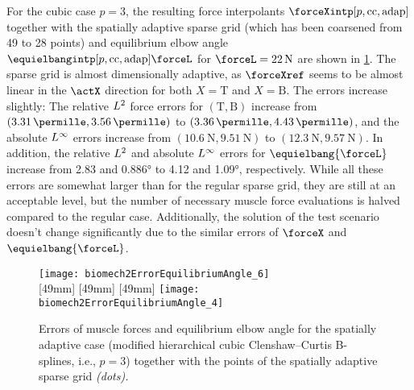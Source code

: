 For the cubic case $p = 3$,
the resulting force interpolants $\forceXintp[p,\cc,\mathrm{adap}]$ together
with the spatially adaptive sparse grid
(which has been coarsened from 49 to 28 points) and
equilibrium elbow angle $\equielbangintp[p,\cc,\mathrm{adap}]{\forceL}$
for $\forceL = \SI{22}{\newton}$ are shown in
\cref{fig:biomech2SpatiallyAdaptive}.
The sparse grid is almost dimensionally adaptive,
as $\forceXref$ seems to be almost linear in the $\actX$ direction
for both $X = \mathrm{T}$ and $X = \mathrm{B}$.
The errors increase slightly:
The relative $L^2$ force errors for $(\mathrm{T}, \mathrm{B})$ increase
from $(\SI{3.31}{\permille}, \SI{3.56}{\permille})$
to $(\SI{3.36}{\permille}, \SI{4.43}{\permille})$,
and the absolute $L^\infty$ errors increase
from $(\SI{10.6}{\newton}, \SI{9.51}{\newton})$
to $(\SI{12.3}{\newton}, \SI{9.57}{\newton})$.
In addition, the relative $L^2$ and absolute $L^\infty$ errors
for $\equielbang{\forceL}$ increase
from \SI{2.83}{\permille} and \ang{0.886}
to \SI{4.12}{\permille} and \ang{1.09}, respectively.
While all these errors are somewhat larger than for the regular sparse grid,
they are still at an acceptable level,
but the number of necessary muscle force evaluations is halved compared
to the regular case.
Additionally, the solution of the test scenario doesn't change significantly
due to the similar errors of $\forceX$ and $\equielbang{\forceL}$.

\begin{figure}
  \hspace*{2mm}%
  \hspace*{12mm}%
  \texttt{[image: biomech2ErrorEquilibriumAngle\_6]}%
  \\[2mm]%
  [49mm]{%
  }%
  \hfill%
  [49mm]{%
  }%
  \hfill%
  [49mm]{%
    \texttt{[image: biomech2ErrorEquilibriumAngle\_4]}%
  }%
  \caption[%
    Errors of muscle forces and equilibrium angle
    for the spatially adaptive case%
  ]{%
    Errors of muscle forces and equilibrium elbow angle
    for the spatially adaptive case
    (modified hierarchical cubic Clenshaw--Curtis B-splines,
    i.e., $p = 3$) together with the points of the
    spatially adaptive sparse grid \emph{(dots).}%
  }%
  \label{fig:biomech2SpatiallyAdaptive}%
\end{figure}
